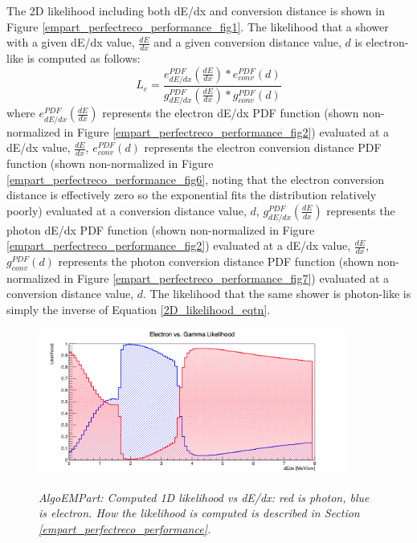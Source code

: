The 2D likelihood including both dE/dx and conversion distance is shown in Figure \ref{empart_perfectreco_performance_fig1}. The likelihood that a shower with a given dE/dx value, $\frac{dE}{dx}$ and a given conversion distance value, $d$ is electron-like is computed as follows: 
\begin{equation}\label{2D_likelihood_eqtn}
L_e= \frac{e_{dE/dx}^{PDF}(\frac{dE}{dx}) * e_{conv}^{PDF}(d)}{g_{dE/dx}^{PDF}(\frac{dE}{dx}) * g_{conv}^{PDF}(d)} 
\end{equation}
where $e_{dE/dx}^{PDF}(\frac{dE}{dx})$ represents the electron dE/dx PDF function (shown non-normalized in Figure \ref{empart_perfectreco_performance_fig2}) evaluated at a dE/dx value, $\frac{dE}{dx}$, $e_{conv}^{PDF}(d)$ represents the electron conversion distance PDF function (shown non-normalized in Figure \ref{empart_perfectreco_performance_fig6}, noting that the electron conversion distance is effectively zero so the exponential fits the distribution relatively poorly) evaluated at a conversion distance value, $d$, $g_{dE/dx}^{PDF}(\frac{dE}{dx})$ represents the photon dE/dx PDF function (shown non-normalized in Figure \ref{empart_perfectreco_performance_fig2}) evaluated at a dE/dx value, $\frac{dE}{dx}$, $g_{conv}^{PDF}(d)$ represents the photon conversion distance PDF function (shown non-normalized in Figure \ref{empart_perfectreco_performance_fig7}) evaluated at a conversion distance value, $d$. The likelihood that the same shower is photon-like is simply the inverse of Equation \ref{2D_likelihood_eqtn}.\\



\begin{figure}[ht!]
\centering
\includegraphics[width=0.9\textwidth]{Figures/EMPartTraining/mc_trained/Likelihood_dEdx.png}\\
\caption{\textit{AlgoEMPart: Computed 1D likelihood vs dE/dx: red is photon, blue is electron. How the likelihood is computed is described in Section \ref{empart_perfectreco_performance}.}}
\label{empart_perfectreco_performance_fig4}
\end{figure}



